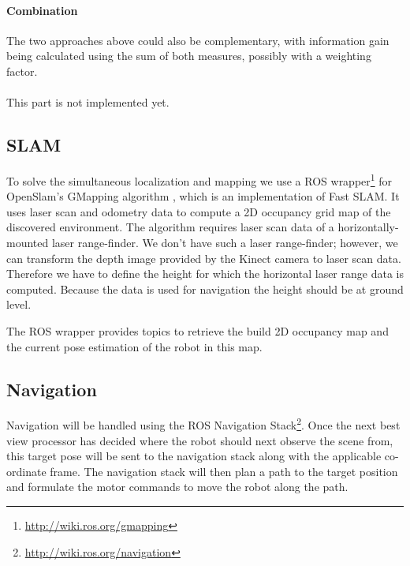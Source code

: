 \documentclass[a4paper,11pt,english]{article}
\begin{document}
\paragraph{Combination}
The two approaches above could also be complementary, with information gain being calculated using the sum of both measures, possibly with a weighting factor.


\paragraph{}
This part is not implemented yet.

\subsection{SLAM}
\label{system:slam}
To solve the simultaneous localization and mapping we use a ROS wrapper\footnote{\url{http://wiki.ros.org/gmapping}} for OpenSlam's GMapping algorithm \cite{grisetti2007}, which is an implementation of Fast SLAM.
It uses laser scan and odometry data to compute a 2D occupancy grid map of the discovered environment.
The algorithm requires laser scan data of a horizontally-mounted laser range-finder.
We don't have such a laser range-finder; however, we can transform the depth image provided by the Kinect camera to laser scan data.
Therefore we have to define the height for which the horizontal laser range data is computed.
Because the data is used for navigation the height should be at ground level.

The ROS wrapper provides topics to retrieve the build 2D occupancy map and the current pose estimation of the robot in this map.

\subsection{Navigation}
\label{system:navigation}
Navigation will be handled using the ROS Navigation Stack\footnote{\url{http://wiki.ros.org/navigation}}.
Once the next best view processor has decided where the robot should next observe the scene from, this target pose will be sent to the navigation stack along with the applicable co-ordinate frame.
The navigation stack will then plan a path to the target position and formulate the motor commands to move the robot along the path.
\end{document}
